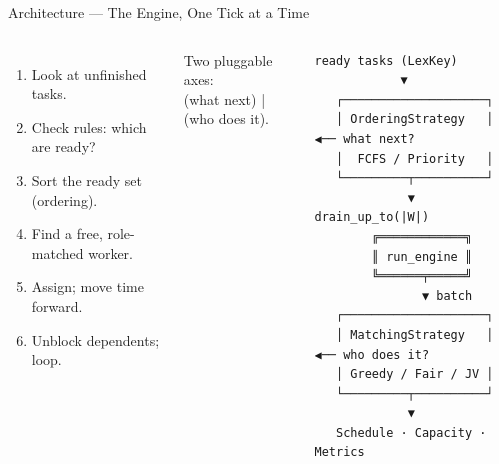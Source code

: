 \documentclass[aspectratio=169, 11pt]{beamer}
\begin{document}
\begin{frame}[fragile]{Architecture --- The Engine, One Tick at a Time}
  \begin{columns}[T,onlytextwidth]
      \begin{enumerate}\small
        \item Look at unfinished tasks.
        \item Check rules: which are ready?
        \item Sort the ready set (ordering).
        \item Find a free, role-matched worker.
        \item Assign; move time forward.
        \item Unblock dependents; loop.
      \end{enumerate}
      \vspace{0.4em}
      \begin{center}\footnotesize\color{slate}
        Two pluggable axes:\\
         (what next) \;|\;
         (who does it).
      \end{center}
      \begin{tcolorbox}[enhanced, breakable=false,
                        colback=boxbg, colframe=ruleblue,
                        boxrule=0.4pt, arc=2pt,
                        left=4pt, right=4pt, top=0pt, bottom=0pt]
\begin{Verbatim}[fontsize=\tiny]
   ready tasks (LexKey)
            ▼
   ┌────────────────────┐
   │ OrderingStrategy   │  ◀── what next?
   │  FCFS / Priority   │
   └─────────┬──────────┘
             ▼ drain_up_to(|W|)
        ╔════════════╗
        ║ run_engine ║
        ╚══════╤═════╝
               ▼ batch
   ┌────────────────────┐
   │ MatchingStrategy   │  ◀── who does it?
   │ Greedy / Fair / JV │
   └─────────┬──────────┘
             ▼
   Schedule · Capacity · Metrics
\end{Verbatim}
      \end{tcolorbox}
  \end{columns}
\end{frame}
\end{document}
